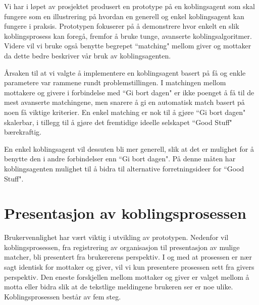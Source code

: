 Vi har i løpet av prosjektet produsert en prototype på en koblingsagent som skal fungere som en illustrering på hvordan en generell og enkel koblingsagent kan fungere i praksis. Prototypen fokuserer på å demonstrere hvor enkelt en slik koblingsprosess kan foregå, fremfor å bruke tunge, avanserte koblingsalgoritmer. Videre vil vi bruke også benytte begrepet ``matching" mellom giver og mottaker da dette bedre beskriver vår bruk av koblingsagenten.

Årsaken til at vi valgte å implementere en koblingsagent basert på få og enkle parametere var rammene rundt problemstillingen. I matchingen mellom mottakere og givere i forbindelse med ``Gi bort dagen" er ikke poenget å få til de mest avanserte matchingene, men snarere å gi en automatisk match basert på noen få viktige kriterier. En enkel matching er nok til å gjøre ``Gi bort dagen" skalerbar, i tillegg til å gjøre det fremtidige ideelle selskapet ``Good Stuff" bærekraftig.

En enkel koblingsagent vil dessuten bli mer generell, slik at det er mulighet for å benytte den i andre forbindelser enn ``Gi bort dagen". På denne måten har koblingsagenten mulighet til å bidra til alternative forretningsideer for ``Good Stuff".

\section{Presentasjon av koblingsprosessen}

Brukervennlighet har vært viktig i utvikling av prototypen. Nedenfor vil koblingsprosessen, fra registrering av organisasjon til presentasjon av mulige matcher, bli presentert fra brukererens perspektiv. I og med at prosessen er nær sagt identisk for mottaker og giver, vil vi kun presentere prosessen sett fra givers perspektiv. Den eneste forskjellen mellom mottaker og giver er valget mellom å motta eller bidra slik at de tekstlige meldingene brukeren ser er noe ulike.\\

Koblingsprosessen består av fem steg.\\

